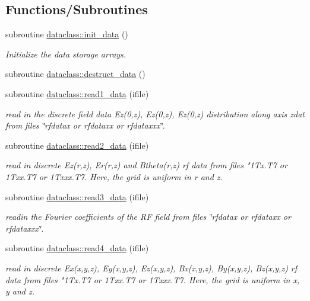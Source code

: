\subsection*{Functions/\+Subroutines}
\begin{DoxyCompactItemize}
\item 
subroutine \mbox{\hyperlink{namespacedataclass_a474ffe5e76484d63015aaf6255c27294}{dataclass\+::init\+\_\+data}} ()
\begin{DoxyCompactList}\small\item\em Initialize the data storage arrays. \end{DoxyCompactList}\item 
subroutine \mbox{\hyperlink{namespacedataclass_ac5b255034c2a115b6740378b4d1e630e}{dataclass\+::destruct\+\_\+data}} ()
\item 
subroutine \mbox{\hyperlink{namespacedataclass_a6733af7e3067d69140c61e2b4580a70b}{dataclass\+::read1\+\_\+data}} (ifile)
\begin{DoxyCompactList}\small\item\em read in the discrete field data Ez(0,z), Ez\textquotesingle{}(0,z), Ez\textquotesingle{}\textquotesingle{}(0,z) distribution along axis zdat from files \char`\"{}rfdatax or rfdataxx 
 or rfdataxxx\char`\"{}. \end{DoxyCompactList}\item 
subroutine \mbox{\hyperlink{namespacedataclass_abf0c8413e040d7ea8c0bc5df73c9ef96}{dataclass\+::read2\+\_\+data}} (ifile)
\begin{DoxyCompactList}\small\item\em read in discrete Ez(r,z), Er(r,z) and Btheta(r,z) rf data from files "1\+Tx.\+T7 or 1\+Txx.\+T7 or 1\+Txxx.\+T7. Here, the grid is uniform in r and z. \end{DoxyCompactList}\item 
subroutine \mbox{\hyperlink{namespacedataclass_a39afae6095340e01362de7d4876aee60}{dataclass\+::read3\+\_\+data}} (ifile)
\begin{DoxyCompactList}\small\item\em readin the Fourier coefficients of the RF field from files \char`\"{}rfdatax or rfdataxx or rfdataxxx\char`\"{}. \end{DoxyCompactList}\item 
subroutine \mbox{\hyperlink{namespacedataclass_a2ef1f00ff4295094270a70c5d3763019}{dataclass\+::read4\+\_\+data}} (ifile)
\begin{DoxyCompactList}\small\item\em read in discrete Ex(x,y,z), Ey(x,y,z), Ez(x,y,z), Bx(x,y,z), By(x,y,z), Bz(x,y,z) rf data from files "1\+Tx.\+T7 or 1\+Txx.\+T7 or 1\+Txxx.\+T7. Here, the grid is uniform in x, y and z. \end{DoxyCompactList}\item 

\end{DoxyCompactItemize}
